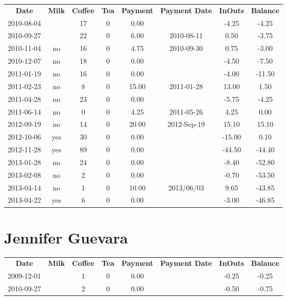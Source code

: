 \begin{center}
\begin{tabular}{cccccccc}
\textbf{Date} & \textbf{Milk} & \textbf{Coffee} & \textbf{Tea} & \textbf{Payment} & \textbf{Payment Date} & \textbf{InOuts} & \textbf{Balance} \\
2010-08-04 &  & 17 & 0 &  0.00 &  &  -4.25 &  -4.25\\ 
2010-09-27 &  & 22 & 0 &  6.00 & 2010-08-11 &   0.50 &  -3.75\\ 
2010-11-04 & no & 16 & 0 &  4.75 & 2010-09-30 &   0.75 &  -3.00\\ 
2010-12-07 & no & 18 & 0 &  0.00 &  &  -4.50 &  -7.50\\ 
2011-01-19 & no & 16 & 0 &  0.00 &  &  -4.00 & -11.50\\ 
2011-02-23 & no &  8 & 0 & 15.00 & 2011-01-28 &  13.00 &   1.50\\ 
2011-04-28 & no & 23 & 0 &  0.00 &  &  -5.75 &  -4.25\\ 
2011-06-14 & no &  0 & 0 &  4.25 & 2011-05-26 &   4.25 &   0.00\\ 
2012-09-19 & no & 14 & 0 & 20.00 & 2012-Sep-19 &  15.10 &  15.10\\ 
2012-10-06 & yes & 30 & 0 &  0.00 &  & -15.00 &   0.10\\ 
2012-11-28 & yes & 89 & 0 &  0.00 &  & -44.50 & -44.40\\ 
2013-01-28 & no & 24 & 0 &  0.00 &  &  -8.40 & -52.80\\ 
2013-02-08 & no &  2 & 0 &  0.00 &  &  -0.70 & -53.50\\ 
2013-04-14 & no &  1 & 0 & 10.00 & 2013/06/03 &   9.65 & -43.85\\ 
2013-04-22 & yes &  6 & 0 &  0.00 &  &  -3.00 & -46.85
\end{tabular}
\end{center}

\section{Jennifer Guevara}

\begin{center}
\begin{tabular}{cccccccc}
\textbf{Date} & \textbf{Milk} & \textbf{Coffee} & \textbf{Tea} & \textbf{Payment} & \textbf{Payment Date} & \textbf{InOuts} & \textbf{Balance} \\
2009-12-01 &  & 1 & 0 & 0.00 &  & -0.25 & -0.25\\ 
2010-09-27 &  & 2 & 0 & 0.00 &  & -0.50 & -0.75
\end{tabular}
\end{center}


